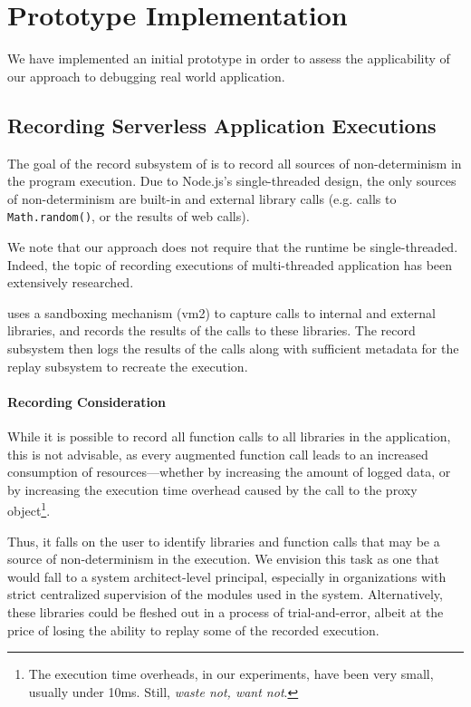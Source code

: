 \section{Prototype Implementation}
We have implemented an initial prototype in order to assess the applicability
of our approach to debugging real world application.

\subsection{Recording Serverless Application Executions}
The goal of the record subsystem of \system is to record all sources of
non-determinism in the program execution. Due to Node.js's single-threaded
design, the only sources of non-determinism are built-in and external library
calls (e.g. calls to \verb|Math.random()|, or the results of web calls).

We note that our approach does not require that the runtime be single-threaded.
Indeed, the topic of recording executions of multi-threaded application has
been extensively researched.

\system uses a sandboxing mechanism (vm2) to capture calls to internal and
external libraries, and records the results of the calls to these libraries.
The record subsystem then logs the results of the calls along with sufficient metadata for the replay subsystem to recreate the execution.

\paragraph{Recording Consideration}
While it is possible to record all function calls to all libraries in the
application, this is not advisable, as every augmented function call leads to an
increased consumption of resources---whether by increasing the amount of logged
data, or by increasing the execution time overhead caused by the call to the
proxy object\footnote{The execution time overheads, in our experiments, have
been very small, usually under 10ms. Still, \emph{waste not, want not}.}.

Thus, it falls on the user to identify libraries and function calls that may be
a source of non-determinism in the execution. We envision this task as one that
would fall to a system architect-level principal, especially in organizations
with strict centralized supervision of the modules used in the system.
Alternatively, these libraries could be fleshed out in a process of
trial-and-error, albeit at the price of losing the ability to replay some of the
recorded execution.

